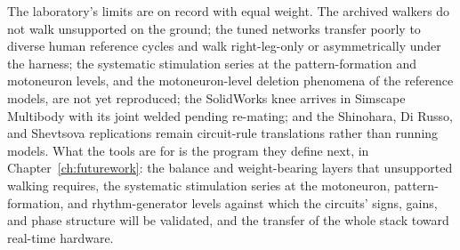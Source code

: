 The laboratory's limits are on record with equal weight. The archived walkers do not walk unsupported on the ground; the tuned networks transfer poorly to diverse human reference cycles and walk right-leg-only or asymmetrically under the harness; the systematic stimulation series at the pattern-formation and motoneuron levels, and the motoneuron-level deletion phenomena of the reference models, are not yet reproduced; the SolidWorks knee arrives in Simscape Multibody with its joint welded pending re-mating; and the Shinohara, Di Russo, and Shevtsova replications remain circuit-rule translations rather than running models. What the tools are for is the program they define next, in Chapter~\ref{ch:futurework}: the balance and weight-bearing layers that unsupported walking requires, the systematic stimulation series at the motoneuron, pattern-formation, and rhythm-generator levels against which the circuits' signs, gains, and phase structure will be validated, and the transfer of the whole stack toward real-time hardware.
